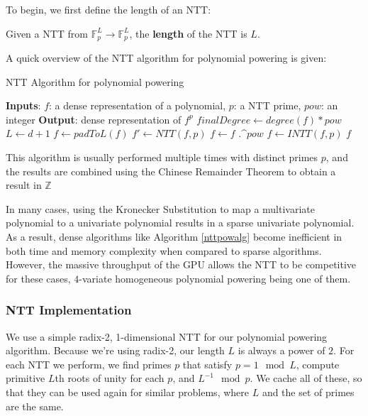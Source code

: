 To begin, we first define the length of an NTT:

\begin{defn}
    Given a NTT from $\mathbb{F}_p^L \rightarrow \mathbb{F}_p^L$, the \textbf{length} of the NTT is $L$.
\end{defn}

A quick overview of the NTT algorithm for polynomial powering is given:

\begin{algorithm}[H]
    \caption{NTT Algorithm for polynomial powering}
    \label{nttpowalg}
    \begin{algorithmic}[1]
    \State \textbf{Inputs}: $f$: a dense representation of a polynomial, $p$: a NTT prime, $pow$: an integer
    \State \textbf{Output}: dense representation of $f ^ p$
	\State $finalDegree \gets degree(f) * pow$
    \State $L \gets d + 1$
    \State $f \gets padToL(f)$ 
    \State $f' \gets NTT(f, p)$
    \State $f \gets f$ .\textasciicircum $pow$ 
    \State $f \gets INTT(f, p)$
    \State \Return $f$
    \end{algorithmic}
\end{algorithm}

This algorithm is usually performed multiple times with distinct primes $p$, and the results are combined using the Chinese Remainder Theorem to obtain a result in $\mathbb{Z}$

In many cases, using the Kronecker Substitution to map a multivariate polynomial to a univariate polynomial results in  a sparse univariate polynomial. As a result, dense algorithms like Algorithm \ref{nttpowalg} become inefficient in both time and memory complexity when compared to sparse algorithms. However, the massive throughput of the GPU allows the NTT to be competitive for these cases, $4$-variate homogeneous polynomial powering being one of them.

\subsubsection{NTT Implementation}

We use a simple radix-2, 1-dimensional NTT for our polynomial powering algorithm. Because we're using radix-2, our length $L$ is always a power of $2$. For each NTT we perform, we find primes $p$ that satisfy $p = 1 \mod L$, compute primitive $L$th roots of unity for each $p$, and $L^{-1} \mod p$. We cache all of these, so that they can be used again for similar problems, where $L$ and the set of primes are the same.

